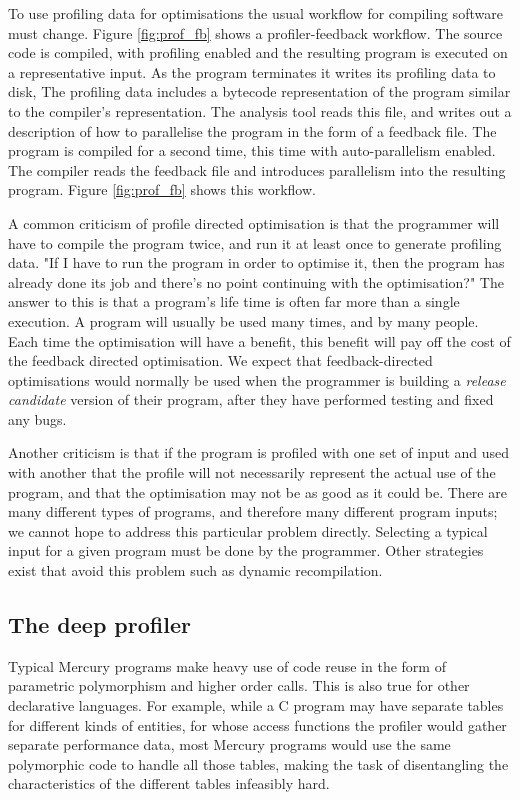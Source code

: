 
To use profiling data for optimisations the usual workflow for compiling
software must change.
Figure \ref{fig:prof_fb} shows a profiler-feedback workflow.
The source code is compiled, with profiling enabled and the resulting program is
executed on a representative input.
As the program terminates it writes its profiling data to disk,
The profiling data includes a bytecode representation of the program
similar to the compiler's representation.
The analysis tool reads this file,
and writes out a description of how to parallelise the program in the form of a
feedback file.
The program is compiled for a second time,
this time with auto-parallelism enabled.
The compiler reads the feedback file and introduces parallelism into the
resulting program.
Figure \ref{fig:prof_fb} shows this workflow.

A common criticism of profile directed optimisation is that the programmer will
have to compile the program twice,
and run it at least once to generate profiling data.
"If I have to run the program in order to optimise it, then the program has
already
done its job and there's no point continuing with the optimisation?"
The answer to this is that a program's life time is often far more than a
single execution.
A program will usually be used many times, and by many people.
Each time the optimisation will have a benefit,
this benefit will pay off the cost of the feedback directed optimisation.
We expect that feedback-directed optimisations would normally be used
when the programmer is building a \emph{release candidate} version of their
program,
after they have performed testing and fixed any bugs.

Another criticism is that if the program is profiled with one set of input and
used with another that the profile will not necessarily represent the actual use
of the program,
and that the optimisation may not be as good as it could be.
There are many different types of programs, and therefore many different
program inputs;
we cannot hope to address this particular problem directly.
Selecting a typical input for a given program must be done by the programmer.
Other strategies exist that avoid this problem
such as dynamic recompilation.

\subsection{The deep profiler}

Typical Mercury programs make heavy use of code reuse in the form of
parametric polymorphism and higher order calls.
This is also true for other declarative languages.
For example, while a C program may have
separate tables for different kinds of entities,
for whose access functions
the profiler would gather separate performance data,
most Mercury programs would use
the same polymorphic code to handle all those tables,
making the task of disentangling the characteristics of the different tables
infeasibly hard.

